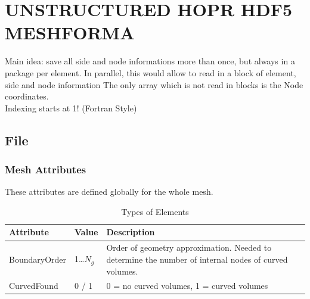 \newpage
\chapter{UNSTRUCTURED HOPR HDF5 MESHFORMA}

Main idea: save all side and node informations more than once, but always in a package per element. In parallel, this would allow to read in a block of element, side and node information The only array which is not read in blocks is the Node coordinates.\\
Indexing starts at 1! (Fortran Style)

\section{File}
\subsection{Mesh Attributes}

These attributes are defined globally for the whole mesh.

\begin{table}[h!]
\centering
\begin{tabularx}{1.0\textwidth}{|l|l|X|} \hline
Attribute     & Value     & Description \\ \hline
BoundaryOrder & 1\ldots $N_g$ & Order of geometry approximation. Needed to determine the number of internal nodes of curved volumes. \\
CurvedFound   & 0 / 1     & 0 = no curved volumes, 1 = curved volumes \\\hline
\end{tabularx}
\caption{Types of Elements}
\end{table}

